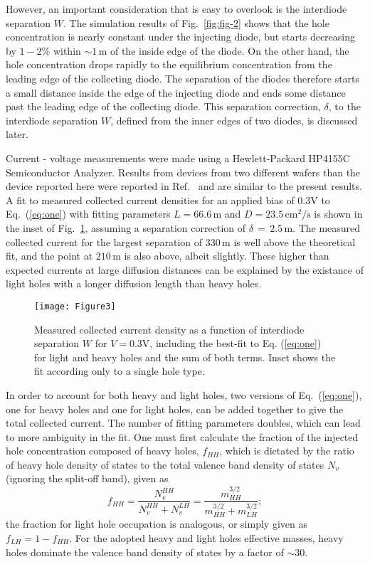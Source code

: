 \documentclass[aip,amsmath,amssymb,reprint]{revtex4-1}
\begin{document}
However, an important consideration that is easy to overlook is the interdiode separation $W$.
 The simulation results of Fig.~\ref{fig:fig-2} shows that the hole concentration is nearly constant under the injecting diode, but starts decreasing by $1-2\%$ within ${\sim}1\,$\textmu m of the inside edge of the diode.
 On the other hand, the hole concentration drops rapidly to the equilibrium concentration from the leading edge of the collecting diode.
 The separation of the diodes therefore starts a small distance inside the edge of the injecting diode and ends some distance past the leading edge of the collecting diode.
 This separation correction, $\delta$, to the interdiode separation $W$, defined from the inner edges of two diodes, is discussed later. 

Current - voltage measurements were made using a Hewlett-Packard HP4155C Semiconductor Analyzer.
 Results from devices from two different wafers than the device reported here were reported in Ref.~ and are similar to the present results.
 A fit to measured collected current densities for an applied bias of 0.3V to Eq.~(\ref{eq:one}) with fitting parameters $L=66.6\,$\textmu m and $D=23.5\,\text{cm}^2/\text{s}$ is shown in the inset of Fig.~\ref{fig:fig-3}, assuming a separation correction of $\delta\,=\,2.5\,$\textmu m.
 The measured collected current for the largest separation of $330\,$\textmu m is well above the theoretical fit, and the point at $210\,$\textmu m is also above, albeit slightly.
 These higher than expected currents at large diffusion distances can be explained by the existance of light holes with a longer diffusion length than heavy holes. 

%
   \begin{figure} [t]
   \begin{center}
   \texttt{[image: Figure3]}
   \end{center}
   \caption[example]
   { \label{fig:fig-3}
Measured collected current density as a function of interdiode separation
 $W$ for $V=0.3$V, including the best-fit to Eq. (\ref{eq:one}) for light
 and heavy holes and the sum of both terms.
Inset shows the fit according only to a single hole type.}
   \end{figure}

In order to account for both heavy and light holes, two versions of
 Eq.~(\ref{eq:one}), one for heavy holes and one for light holes, can be
 added together to give the total collected current.
 The number of fitting parameters doubles, which can lead to more ambiguity
 in the fit. One must first calculate the fraction of the injected hole
 concentration composed of heavy holes, $f_{HH}$, which is dictated by the
 ratio of heavy hole density of states to the total valence band density of
 states $N_v$ (ignoring the split-off band), given as
%
\begin{equation}
\label{eq:two}
f_{HH}=\frac{N_v^{HH}}{N_v^{HH}+N_v^{LH}} = \frac{m_{HH}^{3/2}}{m_{HH}^{3/2}+m_{LH}^{3/2}};
\end{equation}
%
the fraction for light hole occupation is analogous, or simply given
 as $f_{LH}=1-f_{HH}$. For the adopted heavy and light holes effective masses,
 heavy holes dominate the valence band density of states by a factor of ${\sim}30$. 
\end{document}
